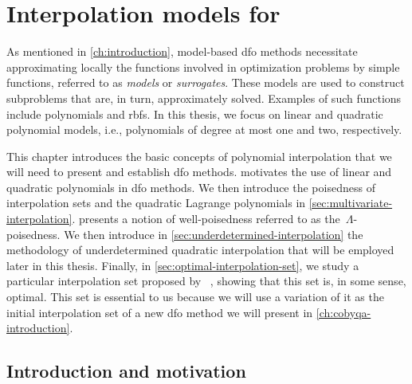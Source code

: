 %
%
%
\chapter{Interpolation models for }
\label{ch:interpolation}

As mentioned in \cref{ch:introduction}, model-based \gls{dfo} methods necessitate approximating locally the functions involved in optimization problems by simple functions, referred to as \emph{models} or \emph{surrogates}.
These models are used to construct subproblems that are, in turn, approximately solved.
Examples of such functions include polynomials and \glspl{rbf}.
In this thesis, we focus on linear and quadratic polynomial models, i.e., polynomials of degree at most one and two, respectively.

This chapter introduces the basic concepts of polynomial interpolation that we will need to present and establish \gls{dfo} methods.
 motivates the use of linear and quadratic polynomials in \gls{dfo} methods.
We then introduce the poisedness of interpolation sets and the quadratic Lagrange polynomials in \cref{sec:multivariate-interpolation}.
 presents a notion of well-poisedness referred to as the~$\Lambda$-poisedness.
We then introduce in \cref{sec:underdetermined-interpolation} the methodology of underdetermined quadratic interpolation that will be employed later in this thesis.
Finally, in \cref{sec:optimal-interpolation-set}, we study a particular interpolation set proposed by \citeauthor{Powell_2006}~\cite{Powell_2006}, showing that this set is, in some sense, optimal.
This set is essential to us because we will use a variation of it as the initial interpolation set of a new \gls{dfo} method we will present in \cref{ch:cobyqa-introduction}.

\section{Introduction and motivation}
\label{sec:interpolation-introduction}

